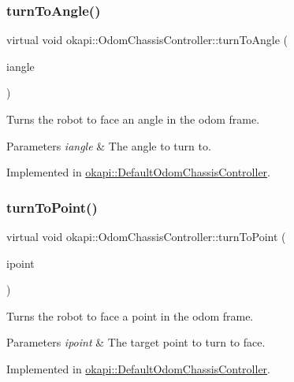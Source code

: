 \subsubsection{\texorpdfstring{turnToAngle()}{turnToAngle()}}
{\footnotesize\ttfamily virtual void okapi\+::\+Odom\+Chassis\+Controller\+::turn\+To\+Angle (\begin{DoxyParamCaption}\item[{const Q\+Angle \&}]{iangle }\end{DoxyParamCaption})\hspace{0.3cm}{\ttfamily [pure virtual]}}

Turns the robot to face an angle in the odom frame.


\begin{DoxyParams}{Parameters}
{\em iangle} & The angle to turn to. \\
\hline
\end{DoxyParams}


Implemented in \mbox{\hyperlink{classokapi_1_1DefaultOdomChassisController_aaf6e4d74384b87510d35b639e45f9dc2}{okapi\+::\+Default\+Odom\+Chassis\+Controller}}.

\mbox{\label{classokapi_1_1OdomChassisController_a4566bc34f36fd107bc868b17942f4245}} 
\subsubsection{\texorpdfstring{turnToPoint()}{turnToPoint()}}
{\footnotesize\ttfamily virtual void okapi\+::\+Odom\+Chassis\+Controller\+::turn\+To\+Point (\begin{DoxyParamCaption}\item[{const \mbox{\hyperlink{structokapi_1_1Point}{Point}} \&}]{ipoint }\end{DoxyParamCaption})\hspace{0.3cm}{\ttfamily [pure virtual]}}

Turns the robot to face a point in the odom frame.


\begin{DoxyParams}{Parameters}
{\em ipoint} & The target point to turn to face. \\
\hline
\end{DoxyParams}


Implemented in \mbox{\hyperlink{classokapi_1_1DefaultOdomChassisController_a6692219d4f4c264346c5c8096be41610}{okapi\+::\+Default\+Odom\+Chassis\+Controller}}.



